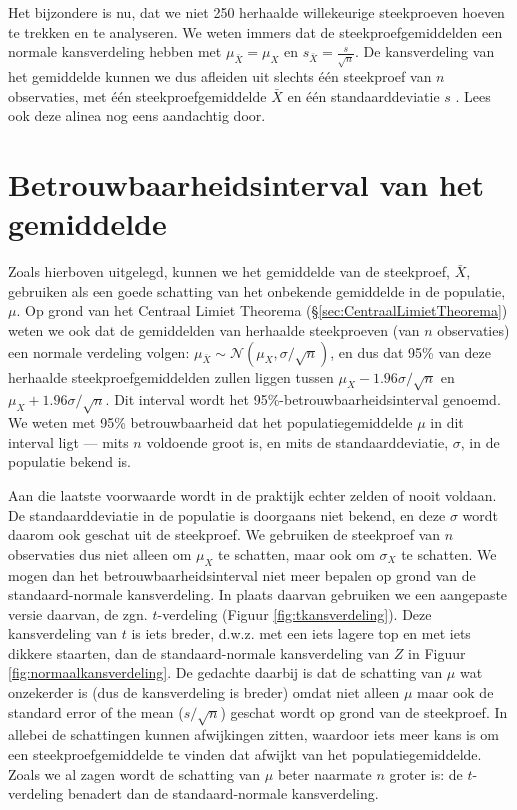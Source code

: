 \documentclass[
]{book}
\begin{document}
Het bijzondere is nu, dat we niet 250 herhaalde willekeurige
steekproeven hoeven te trekken en te analyseren. We weten immers dat de
steekproefgemiddelden een normale kansverdeling hebben met
\(\mu_{\bar{X}} = \mu_X\) en \(s_{\bar{X}} = \frac{s}{\sqrt{n}}\). De
kansverdeling van het gemiddelde kunnen we dus afleiden uit slechts één
steekproef van \(n\) observaties, met één steekproefgemiddelde \(\bar{X}\)
en één standaarddeviatie \(s\) \citep{Cumm12}. Lees ook deze alinea nog eens
aandachtig door.

\section{Betrouwbaarheidsinterval van het gemiddelde}\label{sec:betrouwbaarheidsinterval-gemiddelde}

Zoals hierboven uitgelegd, kunnen we het gemiddelde van de steekproef,
\(\bar{X}\), gebruiken als een goede schatting van het onbekende
gemiddelde in de populatie, \(\mu\). Op grond van het Centraal Limiet
Theorema (§\ref{sec:CentraalLimietTheorema}) weten we ook dat de gemiddelden
van herhaalde steekproeven (van \(n\) observaties) een normale verdeling
volgen: \(\mu_{\bar{X}} \sim \mathcal{N}(\mu_{X},\sigma/\sqrt{n})\), en
dus dat 95\% van deze herhaalde steekproefgemiddelden zullen liggen
tussen \(\mu_{X}-1.96\sigma/\sqrt{n}\) en \(\mu_{X}+1.96\sigma/\sqrt{n}\).
Dit interval wordt het 95\%-betrouwbaarheidsinterval genoemd. We weten
met 95\% betrouwbaarheid dat het populatiegemiddelde \(\mu\) in dit
interval ligt --- mits \(n\) voldoende groot is, en mits de
standaarddeviatie, \(\sigma\), in de populatie bekend is.

Aan die laatste voorwaarde wordt in de praktijk echter zelden of nooit
voldaan. De standaarddeviatie in de populatie is doorgaans niet bekend,
en deze \(\sigma\) wordt daarom ook geschat uit de steekproef. We
gebruiken de steekproef van \(n\) observaties dus niet alleen om \(\mu_X\)
te schatten, maar ook om \(\sigma_X\) te schatten. We mogen dan het
betrouwbaarheidsinterval niet meer bepalen op grond van de
standaard-normale kansverdeling. In plaats daarvan gebruiken we een
aangepaste versie daarvan, de zgn. \(t\)-verdeling
(Figuur \ref{fig:tkansverdeling}). Deze kansverdeling van \(t\) is iets
breder, d.w.z. met een iets lagere top en met iets dikkere staarten, dan
de standaard-normale kansverdeling van \(Z\) in
Figuur \ref{fig:normaalkansverdeling}.
De gedachte daarbij is dat de
schatting van \(\mu\) wat onzekerder is (dus de kansverdeling is breder)
omdat niet alleen \(\mu\) maar ook de standard error of the mean
(\(s/\sqrt{n}\)) geschat wordt op grond van de steekproef. In allebei de
schattingen kunnen afwijkingen zitten, waardoor iets meer kans is om een
steekproefgemiddelde te vinden dat afwijkt van het populatiegemiddelde.
Zoals we al zagen wordt de schatting van \(\mu\) beter naarmate \(n\) groter
is: de \(t\)-verdeling benadert dan de standaard-normale kansverdeling.
\end{document}
